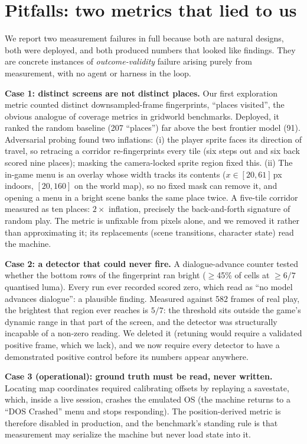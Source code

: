 \documentclass{article} %
\begin{document}
\section{Pitfalls: two metrics that lied to us}
\label{sec:pitfalls}

We report two measurement failures in full because both are natural designs,
both were deployed, and both produced numbers that looked like findings.
They are concrete instances of \emph{outcome-validity} failure
\citep{zhu2025establishing} arising purely from measurement, with no agent or harness
in the loop.

\textbf{Case 1: distinct screens are not distinct places.} Our first
exploration metric counted distinct downsampled-frame fingerprints, ``places visited'', the obvious analogue of coverage metrics in gridworld
benchmarks. Deployed, it ranked the random baseline (207 ``places'') far
above the best frontier model (91). Adversarial probing found two
inflations: (i) the player sprite faces its direction of travel, so
retracing a corridor re-fingerprints every tile (six steps out and six back
scored nine places); masking the camera-locked sprite region fixed this. (ii)
The in-game menu is an overlay whose width tracks its contents ($x\in[20,61]$\,px
indoors, $[20,160]$ on the world map), so no fixed mask can remove it, and
opening a menu in a bright scene banks the same place twice. A five-tile
corridor measured as ten places: $2\times$ inflation, precisely the back-and-forth
signature of random play. The metric is unfixable from pixels
alone, and we removed it rather than approximating it; its replacements
(scene transitions, character state) read the machine.

\textbf{Case 2: a detector that could never fire.} A dialogue-advance
counter tested whether the bottom rows of the fingerprint ran bright
($\ge$45\% of cells at $\ge 6/7$ quantised luma). Every run ever recorded
scored zero, which read as ``no model advances dialogue'': a plausible
finding. Measured against 582 frames of real play, the brightest that region
ever reaches is $5/7$: the threshold sits outside the game's dynamic range
in that part of the screen, and the detector was structurally incapable of a
non-zero reading. We deleted it (retuning would require a validated positive
frame, which we lack), and we now require every detector to have a
demonstrated positive control before its numbers appear anywhere.

\textbf{Case 3 (operational): ground truth must be read, never written.}
Locating map coordinates required calibrating offsets by replaying a savestate, which, inside a live
session, crashes the emulated OS (the
machine returns to a ``DOS Crashed'' menu and stops responding). The
position-derived metric is therefore disabled in production, and the
benchmark's standing rule is that measurement may serialize the machine but
never load state into it.
\end{document}

